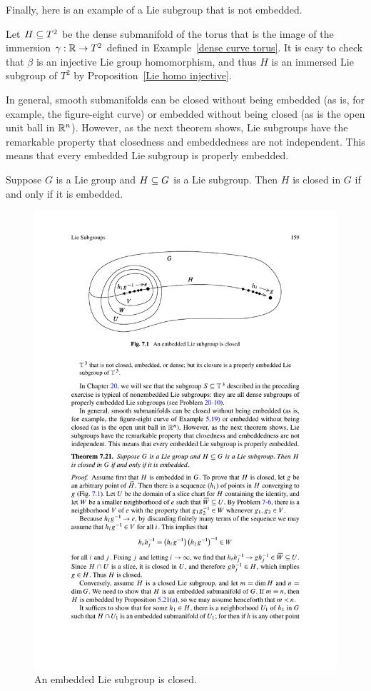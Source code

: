 Finally, here is an example of a Lie subgroup that is not embedded.
\begin{example}
Let $H\subseteq T^2$ be the dense submanifold of the torus that is the image of the immersion $\gamma:\mathbb{R}\to T^2$ defined in Example~\ref{dense curve torus}. It is easy to check that $\beta$ is an injective Lie group homomorphism, and thus $H$ is an immersed Lie subgroup of $T^2$ by Proposition~\ref{Lie homo injective}.
\end{example}
In general, smooth submanifolds can be closed without being embedded (as is, for example, the figure-eight curve) or embedded without being closed (as is the open unit ball in $\mathbb{R}^n$). However, as the next theorem shows, Lie subgroups have the remarkable property that closedness and embeddedness are not independent. This means that every embedded Lie subgroup is properly embedded. 
\begin{theorem}\label{Lie subgroup closed iff embed}
Suppose $G$ is a Lie group and $H\subseteq G$ is a Lie subgroup. Then $H$ is closed in $G$ if and only if it is embedded.
\end{theorem}
\begin{figure}[htbp]
\centering
\includegraphics{pictures/Lie-closed-1}
\caption{An embedded Lie subgroup is closed.}
\end{figure}
